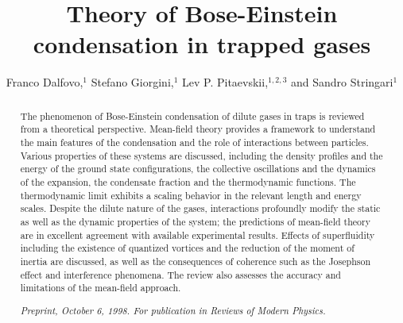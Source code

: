 


\title{Theory of Bose-Einstein condensation in trapped gases} 
\author{Franco Dalfovo,$^1$ Stefano Giorgini,$^{1}$
Lev P. Pitaevskii,$^{1,2,3}$ and Sandro Stringari$^1$}

\address{$^1$ Dipartimento di Fisica, Universit\`a di Trento, and \\
Istituto Nazionale per la Fisica della Materia,
I-38050 Povo, Italy}

\address{$^2$ Department of Physics, TECHNION, Haifa 32000, Israel}

\address{$^3$ Kapitza Institute for Physical Problems,
ul. Kosygina 2, 117334 Moscow}

\maketitle

\date{  } 

\begin{abstract}
The phenomenon of Bose-Einstein condensation of dilute gases in traps 
is reviewed from a theoretical perspective. Mean-field theory provides 
a framework to understand the main features of the condensation and the 
role of interactions between particles. Various properties of these 
systems are discussed, including the density profiles and the energy of 
the ground state configurations, the collective oscillations and the 
dynamics of the expansion, the condensate fraction and the thermodynamic 
functions. The thermodynamic limit exhibits a scaling behavior in the 
relevant length and energy scales. Despite the dilute nature of the gases, 
interactions profoundly modify the static as well as the dynamic properties 
of the system; the predictions of mean-field theory are in excellent 
agreement with available experimental results. Effects of superfluidity 
including the existence of quantized vortices and the reduction of the 
moment of inertia are discussed, as well as the consequences of coherence 
such as the Josephson effect and interference phenomena. The review also 
assesses the accuracy and limitations of the mean-field approach.

\smallskip
\noindent
{\it Preprint, October 6, 1998. For publication in Reviews of Modern 
Physics.  }

\end{abstract}

